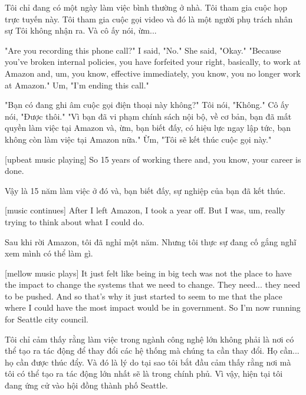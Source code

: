 \documentclass[a4paper]{article}
\begin{document}
	\begin{vietnamese-v2}
		[Maren] Tôi chỉ đang có một ngày làm việc bình thường ở nhà.
		Tôi tham gia cuộc họp trực tuyến này.
		Tôi tham gia cuộc gọi video và đó là một người phụ trách nhân sự
		Tôi không nhận ra.
		Và cô ấy nói, ừm...
	\end{vietnamese-v2}
	
	"Are you recording this phone call?"
	I said, "No." She said, "Okay."
	"Because you've broken internal policies, you have forfeited your right, basically, to work at Amazon and, um, you know, effective immediately, you know, you no longer work at Amazon."
	Um, "I'm ending this call."
	
	\begin{vietnamese-v2}
		"Bạn có đang ghi âm cuộc gọi điện thoại này không?"
		Tôi nói, "Không." Cô ấy nói, "Được thôi."
		"Vì bạn đã vi phạm chính sách nội bộ, về cơ bản, bạn đã mất quyền làm việc tại Amazon và, ừm, bạn biết đấy, có hiệu lực ngay lập tức, bạn không còn làm việc tại Amazon nữa."
		Ừm, "Tôi sẽ kết thúc cuộc gọi này."
	\end{vietnamese-v2}
	
	[upbeat music playing]
	So 15 years of working there and, you know, your career is done.
	
	\begin{vietnamese-v2}
		Vậy là 15 năm làm việc ở đó và, bạn biết đấy, sự nghiệp của bạn đã kết thúc.
	\end{vietnamese-v2}
	
	[music continues]
	After I left Amazon, I took a year off.
	But I was, um, really trying to think about what I could do.
	
	\begin{vietnamese-v2}
		Sau khi rời Amazon, tôi đã nghỉ một năm.
		Nhưng tôi thực sự đang cố gắng nghĩ xem mình có thể làm gì.
	\end{vietnamese-v2}
	
	[mellow music plays]
	It just felt like being in big tech was not the place to have the impact to change the systems that we need to change.
	They need... they need to be pushed.
	And so that's why it just started to seem to me that the place where I could have the most impact would be in government.
	So I'm now running for Seattle city council.
	
	\begin{vietnamese-v2}
		Tôi chỉ cảm thấy rằng làm việc trong ngành công nghệ lớn không phải là nơi có thể tạo ra tác động để thay đổi các hệ thống mà chúng ta cần thay đổi.
		Họ cần... họ cần được thúc đẩy.
		Và đó là lý do tại sao tôi bắt đầu cảm thấy rằng nơi mà tôi có thể tạo ra tác động lớn nhất sẽ là trong chính phủ.
		Vì vậy, hiện tại tôi đang ứng cử vào hội đồng thành phố Seattle.
	\end{vietnamese-v2}
	
\end{document}
